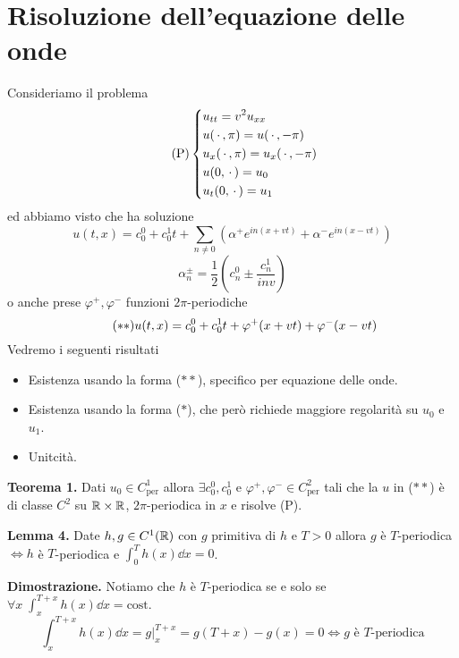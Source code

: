 
\section{Risoluzione dell'equazione delle onde}

Consideriamo il problema
\begin{equation}
	\tag{P}
	\left\{
	\begin{aligned}
			& u_{tt} = v^2 u_{xx} \\
			& u(\,\cdot\,, \pi) = u(\,\cdot\,, -\pi) \\
			& u_x(\,\cdot\,, \pi) = u_x(\,\cdot\,, -\pi) \\
			& u(0,\,\cdot\,) = u_0 \\
			& u_t(0,\,\cdot\,) = u_1
	\end{aligned}
	\right.
\end{equation}
ed abbiamo visto che ha soluzione
\begin{equation}
	\tag{$*$}
	u(t,x) = c_0^0 + c_0^1 t + \sum_{n \neq  0} (\alpha^+ e^{in(x + vt)} + \alpha^- e^{in(x - vt)})
\end{equation}
$$
\alpha^{\pm}_n = \frac{1}{2}\left( c_n^0 \pm \frac{c^1_n}{i n v} \right)
$$
o anche prese $\varphi^+, \varphi^-$ funzioni $2\pi$-periodiche
\begin{equation}
	\tag{$**$}
	u(t,x) = c_0^0 + c_0^1 t + \varphi^+(x + vt) + \varphi^-(x - vt)
\end{equation}
Vedremo i seguenti risultati

\begin{itemize}
	\item Esistenza usando la forma ($**$), specifico per equazione delle onde.
	\item Esistenza usando la forma ($*$), che però richiede maggiore regolarità su $u_0$ e $u_1$.
	\item Unitcità.
\end{itemize}

\textbf{Teorema 1.}
Dati $u_0 \in C^1_{\text{per}}$ allora $\exists c_0^0, c_0^1$ e $\varphi^+, \varphi^- \in C^2_{\text{per}}$ tali che la $u$ in ($**$) è di classe $C^2$ su $\mathbb R \times \mathbb R$, $2\pi$-periodica in $x$ e risolve (P).

\textbf{Lemma 4.}
Date $h, g \in C^1(\mathbb R)$ con $g$ primitiva di $h$ e $T > 0$ allora $g$ è $T$-periodica $\iff h$ è $T$-periodica e $\int_0^T h(x) \dd x = 0$.

\textbf{Dimostrazione.}
Notiamo che $h$ è $T$-periodica se e solo se $\forall x \; \int_{x}^{T+x} h(x) \dd x = \text{cost.}$
$$
\int_{x}^{T+x} h(x) \dd x = g \Big|_x^{T+x} = g(T + x) - g(x) = 0 \iff \text{$g$ è $T$-periodica}
$$

